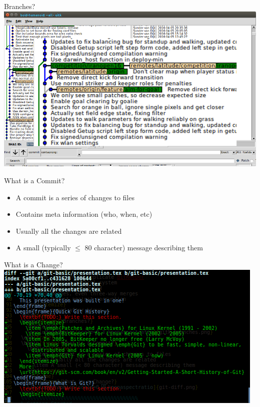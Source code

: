 \documentclass{beamer}
\begin{document}
  \begin{frame}{Branches?}
    \centering
    \includegraphics[scale=0.3,keepaspectratio]{gitk-branches.png}
  \end{frame}
  \begin{frame}{What is a Commit?}
    \begin{itemize}
      \item A commit is a series of changes to files
      \item Contains meta information (who, when, etc)
      \item Usually all the changes are related
      \item A small (typically $ \leqslant $ 80 character) message describing
        them
    \end{itemize}
  \end{frame}
  \begin{frame}{What is a Change?}
    \centering
    \includegraphics[scale=0.5,keepaspectratio]{git-diff.png}
  \end{frame}
\end{document}
